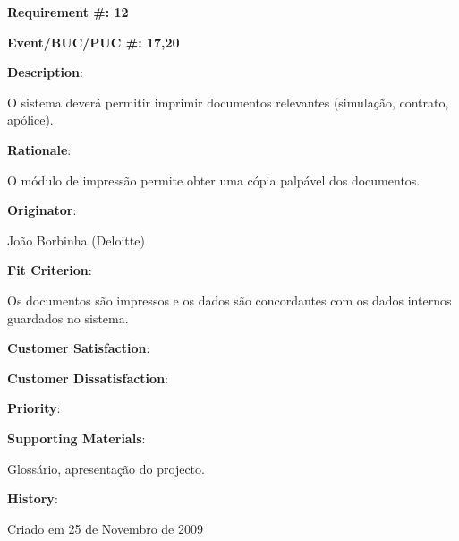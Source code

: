\pagebreak

\begin{minipage}{0.55\textwidth}
\begin{flushleft}\textbf{Requirement \#: 12}\end{flushleft}
\end{minipage}
\begin{minipage}{0.4\textwidth}
\begin{flushright}\textbf{Event/BUC/PUC \#: 17,20}\end{flushright}
\end{minipage}

\begin{description}
\item \textbf{Description}:

O sistema deverá permitir imprimir documentos relevantes (simulação, contrato, apólice).\\

\item \textbf{Rationale}:

O módulo de impressão permite obter uma cópia palpável dos documentos.\\

\item \textbf{Originator}:

João Borbinha (Deloitte)\\

\item \textbf{Fit Criterion}:

Os documentos são impressos e os dados são concordantes com os dados internos guardados no sistema.\\

\begin{minipage}{0.45\textwidth}
\begin{flushleft}\item \textbf{Customer Satisfaction}:\end{flushleft}
\end{minipage}
\begin{minipage}{0.45\textwidth}
\begin{flushleft}\item \textbf{Customer Dissatisfaction}:\end{flushleft}
\end{minipage}

\item \textbf{Priority}:

\item \textbf{Supporting Materials}:

Glossário, apresentação do projecto.\\

\item \textbf{History}:

Criado em 25 de Novembro de 2009\\
\end{description}


